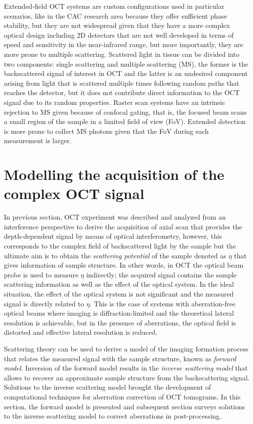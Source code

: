 Extended-field OCT systems are custom configurations used in particular scenarios, like in the CAC research area because they offer sufficient phase stability, but they are not widespread given that they have a more complex optical design including 2D detectors that are not well developed in terms of speed and sensitivity in the near-infrared range, but more importantly, they are more prone to multiple scattering. Scattered light in tissue can be divided into two components: single scattering and multiple scattering (MS), the former is the backscattered signal of interest in OCT and the latter is an undesired component arising from light that is scattered multiple times following random paths that reaches the detector, but it does not contribute direct information to the OCT signal due to its random properties. Raster scan systems have an intrinsic rejection to MS given because of confocal gating, that is, the focused beam scans a small region of the sample in a limited field of view (FoV). Extended detection is more prone to collect MS photons given that the FoV during each measurement is larger.

\section{Modelling the acquisition of the complex OCT signal}\label{Model}

In previous section, OCT experiment was described and analyzed from an interference perspective to derive the acquisition of axial scan that provides the depth-dependent signal by means of optical interferometry, however, this corresponds to the complex field of backscattered light by the sample but the ultimate aim is to obtain the \textit{scattering potential} of the sample denoted as $\eta$ that gives information of sample structure. In other words, in OCT the optical beam probe is used to measure $\eta$ indirectly; the acquired signal contains the sample scattering information as well as the effect of the optical system. In the ideal situation, the effect of the optical system is not significant and the measured signal is directly related to $\eta$. This is the case of systems with aberration-free optical beams where imaging is diffraction-limited and the theoretical lateral resolution is achievable, but in the presence of aberrations, the optical field is distorted and effective lateral resolution is reduced.

Scattering theory can be used to derive a model of the imaging formation process that relates the measured signal with the sample structure, known as \textit{forward model}. Inversion of the forward model results in the \textit{inverse scattering model} that allows to recover an approximate sample structure from the backscattering signal. Solutions to the inverse scattering model brought the development of computational techniques for aberration correction of OCT tomograms. In this section, the forward model is presented and subsequent section surveys solutions to the inverse scattering model to correct aberrations in post-processing.

